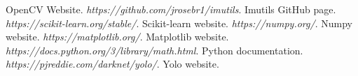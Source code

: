 \documentclass[a4paper]{article}
\begin{document}
\begin{thebibliography}{19}
		OpenCV Website.
		\textit{https://github.com/jrosebr1/imutils}. \newline
		Imutils GitHub page.
		\textit{https://scikit-learn.org/stable/}. \newline
		Scikit-learn website.
		\textit{https://numpy.org/}. \newline
		Numpy website.
		\textit{https://matplotlib.org/}. \newline
		Matplotlib website.
		\textit{https://docs.python.org/3/library/math.html}. \newline
		Python documentation.
		\textit{https://pjreddie.com/darknet/yolo/}. \newline
		Yolo website.
	\end{thebibliography}
\end{document}
